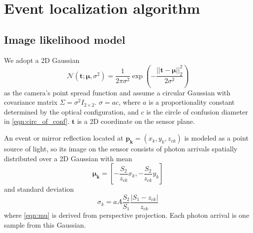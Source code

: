 \section{Event localization algorithm}

\subsection{Image likelihood model}

We adopt a 2D Gaussian 
\begin{equation}
\mathcal{N}(\bm{t};\bm{\mu},\sigma^2)=\frac{1}{2\pi\sigma^2}\exp\left({-\frac{||\bm{t}-\bm{\mu}||_2^2}{2\sigma^2}}\right) 
\end{equation}
as the camera's point spread function and assume a circular Gaussian with 
covariance matrix $\Sigma=\sigma^2 I_{2\times2}$. 
$\sigma=ac$, where $a$ is a proportionality constant determined by the 
optical configuration, and $c$ is the circle of confusion diameter in \cref{eqn:circ_of_conf}.
$\bm{t}$ is a 2D coordinate on the sensor plane.

An event or mirror reflection located at $\bm{p_k}=(x_k,y_k,z_{ck})$ is modeled as 
a point source of light, so its image on the sensor consists of photon arrivals 
spatially distributed over a 2D Gaussian with mean 
\begin{equation} \label{eqn:mu}
\bm{\mu_k}=\left[ -\frac{S_2}{z_{ck}}x_k, -\frac{S_2}{z_{ck}}y_k \right]
\end{equation}
and standard deviation 
\begin{equation} \label{eqn:stdev}
\sigma_k=aA\frac{S_2}{S_1}\frac{|S_1-z_{ck}|}{z_{ck}}
\end{equation}
where \cref{eqn:mu} is derived from perspective projection.
Each photon arrival is one sample from this Gaussian.


